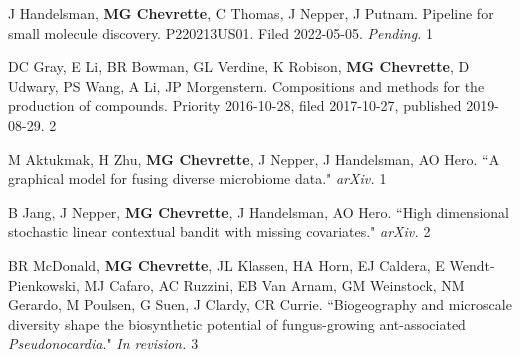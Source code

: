 \begin{cvpubs}


\cvpub
{J Handelsman, \textbf{MG Chevrette}, C Thomas, J Nepper, J Putnam. Pipeline for small molecule discovery. P220213US01. Filed 2022-05-05. \textit{Pending.}}
{1}

\cvpub
{DC Gray, E Li, BR Bowman, GL Verdine, K Robison, \textbf{MG Chevrette}, D Udwary, PS Wang, A Li, JP Morgenstern. Compositions and methods for the production of compounds. Priority 2016-10-28, filed 2017-10-27, published 2019-08-29. \textbf{\textit{}}}
{2}

\end{cvpubs}


 \vspace{-2mm}

\begin{cvpubs}


\cvpub
{M Aktukmak, H Zhu, \textbf{MG Chevrette}, J Nepper, J Handelsman, AO Hero. ``A graphical model for fusing diverse microbiome data." \textit{arXiv. \textbf{}}}
{1}

\cvpub
{B Jang, J Nepper, \textbf{MG Chevrette}, J Handelsman, AO Hero. ``High dimensional stochastic linear contextual bandit with missing covariates." \textit{arXiv. \textbf{}}}
{2}

\cvpub
{BR McDonald, \textbf{MG Chevrette}, JL Klassen, HA Horn, EJ Caldera, E Wendt-Pienkowski, MJ Cafaro, AC Ruzzini, EB Van Arnam, GM Weinstock, NM Gerardo, M Poulsen, G Suen, J Clardy, CR Currie. ``Biogeography and microscale diversity shape the biosynthetic potential of fungus-growing ant-associated \textit{Pseudonocardia}." \textit{In revision. \textbf{}}}
{3}

\end{cvpubs}